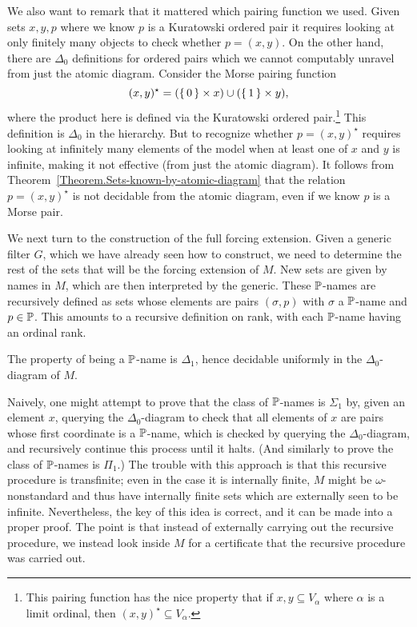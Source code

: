 \documentclass{amsart}
\begin{document}
We also want to remark that it mattered which pairing function we used. Given sets $x,y,p$ where we know $p$ is a Kuratowski ordered pair it requires looking at only finitely many objects to check whether $p = (x,y)$. On the other hand, there are $\Delta_0$ definitions for ordered pairs which we cannot computably unravel from just the atomic diagram. Consider the Morse pairing function
$$(x,y)^\star = (\set{0} \times x) \cup (\set{1} \times y),$$
where the product here is defined via the Kuratowski ordered pair.\footnote{This pairing function has the nice property that if $x,y \subseteq V_\alpha$ where $\alpha$ is a limit ordinal, then $(x,y)^\star \subseteq V_\alpha$.}
This definition is $\Delta_0$ in the \Levy{} hierarchy. But to recognize whether $p = (x,y)^\star$ requires looking at infinitely many elements of the model when at least one of $x$ and $y$ is infinite, making it not effective (from just the atomic diagram). It follows from Theorem~\ref{Theorem.Sets-known-by-atomic-diagram} that the relation $p = (x,y)^\star$ is not decidable from the atomic diagram, even if we know $p$ is a Morse pair.
\smallskip

We next turn to the construction of the full forcing extension.
Given a generic filter $G$, which we have already seen how to construct, we need to determine the rest of the sets that will be the forcing extension of $M$. New sets are given by names in $M$, which are then interpreted by the generic.
These $\P$-names are recursively defined as sets whose elements are pairs $(\sigma,p)$ with $\sigma$ a $\P$-name and $p \in \P$. This amounts to a recursive definition on rank, with each $\P$-name having an ordinal rank.

\begin{lemma}
\label{lemma:Pnames}
The property of being a $\P$-name is $\Delta_1$, hence decidable uniformly in the $\Delta_0$-diagram of $M$.
\end{lemma}

Naively, one might attempt to prove that the class of $\P$-names is $\Sigma_1$ by, given an element $x$, querying the $\Delta_0$-diagram to check that all elements of $x$ are pairs whose first coordinate is a $\P$-name, which is checked by querying the $\Delta_0$-diagram, and recursively continue this process until it halts. (And similarly to prove the class of $\P$-names is $\Pi_1$.) The trouble with this approach is that this recursive procedure is transfinite; even in the case it is internally finite, $M$ might be $\omega$-nonstandard and thus have internally finite sets which are externally seen to be infinite. Nevertheless, the key of this idea is correct, and it can be made into a proper proof. The point is that instead of externally carrying out the recursive procedure, we instead look inside $M$ for a certificate that the recursive procedure was carried out.
\end{document}
